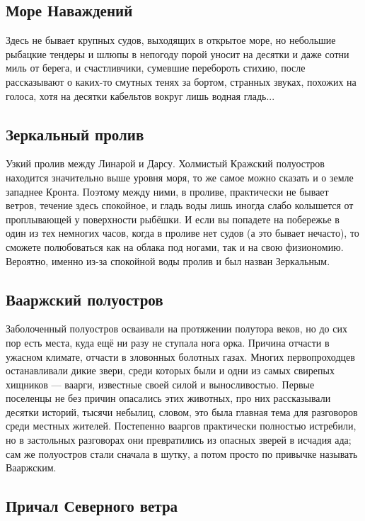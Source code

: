 \documentclass[12pt,a4paper]{book}
\begin{document}
\subsection{Море Наваждений}

Здесь не бывает крупных судов, выходящих в открытое море, но небольшие рыбацкие тендеры и шлюпы в непогоду порой уносит на десятки и даже сотни миль от берега, и счастливчики, сумевшие перебороть стихию, после рассказывают о каких-то смутных тенях за бортом, странных звуках, похожих на голоса, хотя на десятки кабельтов вокруг лишь водная гладь...

\subsection{Зеркальный пролив}

Узкий пролив между Линарой и Дарсу. Холмистый Кражский полуостров находится значительно выше уровня моря, то же самое можно сказать и о земле западнее Кронта. Поэтому между ними, в проливе, практически не бывает ветров, течение здесь спокойное, и гладь воды лишь иногда слабо колышется от проплывающей у поверхности рыбёшки. И если вы попадете на побережье в один из тех немногих часов, когда в проливе нет судов (а это бывает нечасто), то сможете полюбоваться как на облака под ногами, так и на свою физиономию. Вероятно, именно из-за спокойной воды пролив и был назван Зеркальным.

\subsection{Вааржский полуостров}

Заболоченный полуостров осваивали на протяжении полутора веков, но до сих пор есть места, куда ещё ни разу не ступала нога орка. Причина отчасти в ужасном климате, отчасти в зловонных болотных газах. Многих первопроходцев останавливали дикие звери, среди которых были и одни из самых свирепых хищников --- ваарги, известные своей силой и выносливостью. Первые поселенцы не без причин опасались этих животных, про них рассказывали десятки историй, тысячи небылиц, словом, это была главная тема для разговоров среди местных жителей. Постепенно вааргов практически полностью истребили, но в застольных разговорах они превратились из опасных зверей в исчадия ада; сам же полуостров стали сначала в шутку, а потом просто по привычке называть Вааржским.

\subsection{Причал Северного ветра}
\end{document}
